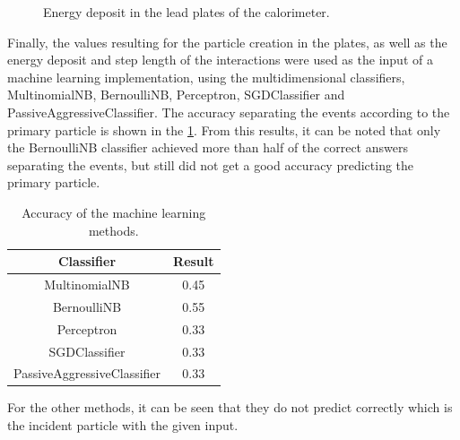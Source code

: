 \begin{figure}[htb!]
  \caption{Energy deposit in the lead plates of the calorimeter.}\label{fig:step-lengt-lead}

\end{figure}

Finally, the values resulting for the particle creation in the plates, as well
as the energy deposit and step length of the interactions were used as the
input of a machine learning implementation, using the multidimensional
classifiers, MultinomialNB, BernoulliNB, Perceptron, SGDClassifier and
PassiveAggressiveClassifier. The accuracy separating the events according to
the primary particle is shown in the \cref{tb:machine-learning-results}. From
this results, it can be noted that only the BernoulliNB classifier achieved
more than half of the correct answers separating the events, but still did not
get a good accuracy predicting the primary particle.

\begin{table}[hbt]
  \centering
  \begin{tabular}{c c}
    \textbf{Classifier} & \textbf{Result}\\
    \toprule
    MultinomialNB & 0.45\\
    \midrule
    BernoulliNB & 0.55\\
    \midrule
    Perceptron & 0.33\\
    \midrule
    SGDClassifier & 0.33\\
    \midrule
    PassiveAggressiveClassifier & 0.33\\
    \bottomrule
  \end{tabular}
  \caption{Accuracy of the machine learning methods.}\label{tb:machine-learning-results}
\end{table}

For the other methods, it can be seen that they do not predict correctly which
is the incident particle with the given input.
